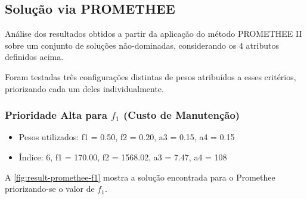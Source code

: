 \documentclass[conference]{IEEEtran}
\begin{document}
\subsection{Solução via PROMETHEE}

Análise dos resultados obtidos a partir da aplicação do método PROMETHEE II
sobre um conjunto de soluções não-dominadas, considerando os 4 atributos 
definidos acima.

Foram testadas três 
configurações distintas de pesos atribuídos a esses critérios, 
priorizando cada um deles individualmente.

\subsubsection{Prioridade Alta para $f_1$ (Custo de Manutenção)}

\begin{itemize}
	\item Pesos utilizados: f1 = 0.50, f2 = 0.20, a3 = 0.15, a4 = 0.15
	\item Índice: 6, f1 = 170.00, f2 = 1568.02, a3 = 7.47, a4 = 108
\end{itemize}

A \autoref{fig:result-promethee-f1} mostra a solução encontrada para o Promethee 
priorizando-se o valor de $f_1$.
\end{document}
